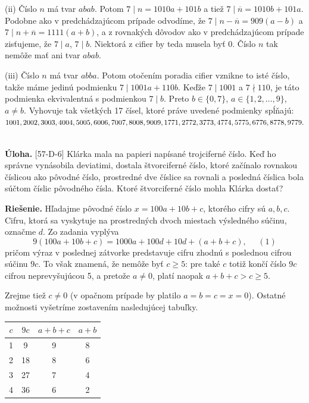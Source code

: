 \documentclass[11pt,a4paper,oneside,final]{book}
\newcommand{\ul}{\textbf{Úloha.} }
\newcommand{\rie}{\textbf{Riešenie.} }
\begin{document}
(ii) Číslo $n$ má tvar $abab$. Potom $7 \mid n = 1010a + 101b$ a tiež $7 \mid \overline{n} = 1010b + 101a$. Podobne ako v predchádzajúcom prípade odvodíme, že $7 \mid n - \overline{n} = 909(a - b)$ a $7 \mid n + \overline{n} = 1111(a + b)$, a z rovnakých dôvodov ako v predchádzajúcom prípade zisťujeme, že $7 \mid a$, $7 \mid b$. Niektorá z cifier by teda musela byť 0. Číslo $n$ tak nemôže mať ani tvar $abab$.

(iii) Číslo $n$ má tvar $abba$. Potom otočením poradia cifier vznikne to isté číslo, takže máme jedinú podmienku $7 \mid 1001a + 110b$. Keďže $7 \mid 1001$ a $7 \nmid 110$, je táto podmienka ekvivalentná s podmienkou $7 \mid b$. Preto $b \in \{0, 7\}$, $a \in \{1, 2, \ldots, 9\}$, $a \neq b$. Vyhovuje tak všetkých 17 čísel, ktoré práve uvedené podmienky spĺňajú: $1001, 2002, 3003, 4004, 5005, 6006, 7007, 8008, 9009, 1771, 2772, \\ 3773, 4774, 5775, 6776, 8778, 9779.$\\
\\
\begin{tcolorbox}[breakable,notitle,boxrule=0pt,colback=light-gray,colframe=light-gray]\ul [57-D-6] Klárka mala na papieri napísané trojciferné číslo. Keď ho správne vynásobila deviatimi, dostala štvorciferné číslo, ktoré začínalo rovnakou číslicou ako pôvodné číslo, prostredné dve číslice sa rovnali a posledná číslica bola súčtom číslic pôvodného čísla. Ktoré štvorciferné číslo mohla Klárka dostať?

\end{tcolorbox}

\rie Hľadajme pôvodné číslo $x = 100a + 10b + c$, ktorého cifry sú $a, b, c$. Cifru, ktorá sa vyskytuje na prostredných dvoch miestach výsledného súčinu, označme $d$. Zo zadania vyplýva
$$ 9(100a + 10b + c) = 1 000a + 100d + 10d + (a + b + c), \ \ \ \ \ \ (1)$$
pričom výraz v poslednej zátvorke predstavuje cifru zhodnú s poslednou cifrou súčinu $9c$. To však znamená, že nemôže byť $c \geq 5$: pre také $c$ totiž končí číslo $9c$ cifrou neprevyšujúcou 5, a pretože $a\neq 0$, platí naopak $a + b + c > c \geq 5$.

Zrejme tiež $c \neq 0$ (v opačnom prípade by platilo $a = b = c = x = 0$). Ostatné
možnosti vyšetríme zostavením nasledujúcej tabuľky.
\begin{center}
\begin{tabular}{|c|c|c|c|}
\hline
$c$ &$9c$ & $a+b+c$ & $a+b$ \\
\hline
\hline
1 & 9 & 9 & 8 \\
\hline
2 & 18 & 8 & 6\\
\hline
3& 27 & 7& 4\\
\hline
4& 36 & 6 & 2\\
\hline
\end{tabular}
\end{center}
\end{document}
